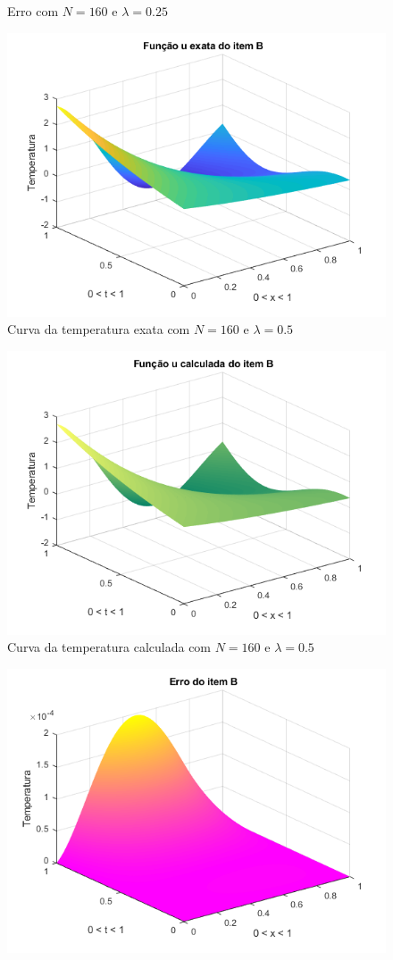 \documentclass[12pt]{article}
\begin{document}
\begin{spacing}{1.5}
\begin{figure}
    \caption{Erro com $N=160$ e $\lambda=0.25$}
    \label{fig:B_n160lambda0-25_erro}
\end{figure}
\begin{figure}
    \centering
    \includegraphics[width=0.8\linewidth]{Primeira_Tarefa/ItemB/n160_lambda0-5_exata.png}
    \caption{Curva da temperatura exata com $N=160$ e $\lambda=0.5$}
    \label{fig:B_n160lambda0-5_exata}
\end{figure}
\begin{figure}
    \centering
    \includegraphics[width=0.8\linewidth]{Primeira_Tarefa/ItemB/n160_lambda0-5_calc.png}
    \caption{Curva da temperatura calculada com $N=160$ e $\lambda=0.5$}
    \label{fig:B_n160lambda0-5_calc}
\end{figure}
\begin{figure}
    \centering
    \includegraphics[width=0.8\linewidth]{Primeira_Tarefa/ItemB/n160_lambda0-5_erro.png}

\end{figure}
\end{spacing}
\end{document}
